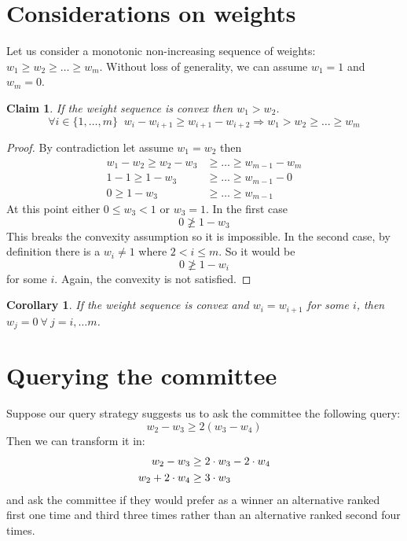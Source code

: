 \documentclass[12pt]{article}
\newtheorem{claim}{Claim}
\newtheorem{corollary}{Corollary}
\begin{document}
\section{Considerations on weights}
\label{sec:weights}
Let us consider a monotonic non-increasing sequence of weights: $w_{1} \geq w_{2} \geq \ldots \geq w_{m}$. Without loss of generality, we can assume $w_1=1$ and $w_m=0$.

\begin{claim}
	\label{clm:wsequence}
	If the weight sequence is convex then $w_{1} > w_{2}$.
	\[\forall i \in \{1,\ldots,m\} \;\; w_i - w_{i+1} \geq w_{i+1}-w_{i+2} \Rightarrow w_{1} > w_{2} \geq \ldots \geq w_{m}\] 
\end{claim}
\begin{proof}
	By contradiction let assume $w_{1} = w_{2}$ then 
	\begin{align*}
	w_{1} - w_{2} \geq w_{2} - w_{3} &\geq \dots \geq w_{m-1} - w_{m} \\
	1 - 1 \geq 1 - w_{3} &\geq \dots \geq w_{m-1} - 0 \\
	0 \geq 1 - w_{3} &\geq \dots \geq w_{m-1}
	\end{align*}
	At this point either $0\leq w_{3}<1$ or $w_{3}=1$. In the first case 
	\[0 \ngeq 1 - w_{3}\]
	This breaks the convexity assumption so it is impossible.
	In the second case, by definition there is a $w_{i} \neq 1$ where $2 < i \leq m$. So it would be 
	\[0 \ngeq 1 - w_{i}\]
	for some $i$. Again, the convexity is not satisfied.
\end{proof}

\begin{corollary}
	\label{cor:weq}
	If the weight sequence is convex and $w_{i} = w_{i+1}$ for some $i$, then $w_{j}=0 \ \forall \
	j=i, \dots m$.
\end{corollary}


\section{Querying the committee}
Suppose our query strategy suggests us to ask the committee the following query:
\[ w_{2} - w_{3} \geq 2(w_{3} - w_{4}) \]
Then we can transform it in:
\begin{align}
\label{eqn:juryquery}
w_{2} - w_{3} &\geq 2 \cdot w_{3} - 2 \cdot w_{4} \notag \\
w_{2} + 2 \cdot w_{4} &\geq 3 \cdot w_{3} 
\end{align}
and ask the committee if they would prefer as a winner an alternative ranked first one time and third three times rather than an alternative ranked second four times.
\end{document}
